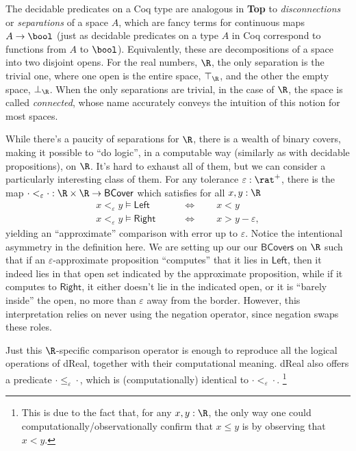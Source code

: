 The decidable predicates on a Coq type are analogous in \textbf{Top} to \emph{disconnections} or \emph{separations} of a space $A$, which are fancy terms for continuous maps $A \to \bool$ (just as decidable predicates on a type $A$ in Coq correspond to functions from $A$ to $\bool$). Equivalently, these are decompositions of a space into two disjoint opens. For the real numbers, $\R$, the only separation is the trivial one, where one open is the entire space, $\top_\R$, and the other the empty space, $\bot_\R$. When the only separations are trivial, in the case of $\R$, the space is called \emph{connected}, whose name accurately conveys the intuition of this notion for most spaces.

While there's a paucity of separations for $\R$, there is a wealth of binary covers, making it possible to ``do logic'', in a computable way (similarly as with decidable propositions), on $\R$. It's hard to exhaust all of them, but we can consider a particularly interesting class of them. For any tolerance $\varepsilon : \rat^+$, there is the map $\cdot <_\varepsilon \cdot : \R \times \R \to \mathsf{BCover}$ which satisfies for all $x, y : \R$
\begin{align*}
x <_\varepsilon y \models \mathsf{Left} 
\qquad &\Leftrightarrow \qquad
x < y
\\
x <_\varepsilon y \models \mathsf{Right} 
\qquad &\Leftrightarrow \qquad
x > y - \varepsilon,
\end{align*}
yielding an ``approximate'' comparison with error up to $\varepsilon$. Notice the intentional asymmetry in the definition here. We are setting up our our $\mathsf{BCovers}$ on $\R$ such that if an $\varepsilon$-approximate proposition ``computes'' that it lies in $\mathsf{Left}$, then it indeed lies in that open set indicated by the approximate proposition, while if it computes to $\mathsf{Right}$, it either doesn't lie in the indicated open, or it is ``barely inside'' the open, no more than $\varepsilon$ away from the border. However, this interpretation relies on never using the negation operator, since negation swaps these roles.

Just this $\R$-specific comparison operator is enough to reproduce all the logical operations of dReal, together with their computational meaning. dReal also offers a predicate $\cdot \le_\varepsilon \cdot$, which  is (computationally) identical to $\cdot <_\varepsilon \cdot$.
\footnote{This is due to the fact that, for any $x, y : \R$, the only way one could computationally/observationally confirm that $x \le y$ is by observing that $x < y$.}

